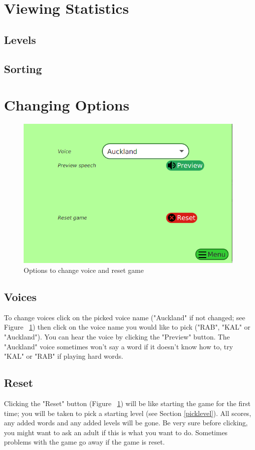 \documentclass[12pt,a4paper,titlepage,onecolumn]{article}
\begin{document}
	\section{Viewing Statistics}
		\subsection{Levels}
		\subsection{Sorting}
		
	\section{Changing Options}
		\begin{figure}[h]
		\centering
		\includegraphics[width=1\linewidth]{Figures/Options/OptionsGeneral}
		\caption[Options Menu]{Options to change voice and reset game}
		\label{fig:OptionsGeneral}
		\end{figure}
		\subsection{Voices}
		To change voices click on the picked voice name ("Auckland" if not changed; see Figure ~\ref{fig:OptionsGeneral}) then click on the voice name you would like to pick ("RAB", "KAL" or "Auckland"). You can hear the voice by clicking the "Preview" button. The "Auckland" voice sometimes won't say a word if it doesn't know how to, try "KAL" or "RAB" if playing hard words.
		\subsection{Reset}
		Clicking the "Reset" button (Figure ~\ref{fig:OptionsGeneral}) will be like starting the game for the first time; you will be taken to pick a starting level (see Section \ref{picklevel}). All scores, any added words and any added levels will be gone. Be very sure before clicking, you might want to ask an adult if this is what you want to do. Sometimes problems with the game go away if the game is reset.
		
\end{document}
